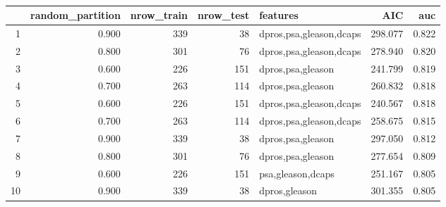 \documentclass[11pt]{article}\usepackage[]{graphicx}\usepackage[]{color}
\begin{document}
\begin{center}
\begin{table}[ht]
\centering
\begin{tabular}{rrrrlrr}
  \hline
 & random\_partition & nrow\_train & nrow\_test & features & AIC & auc \\ 
  \hline
1 & 0.900 &  339 &   38 & dpros,psa,gleason,dcaps & 298.077 & 0.822 \\ 
  2 & 0.800 &  301 &   76 & dpros,psa,gleason,dcaps & 278.940 & 0.820 \\ 
  3 & 0.600 &  226 &  151 & dpros,psa,gleason & 241.799 & 0.819 \\ 
  4 & 0.700 &  263 &  114 & dpros,psa,gleason & 260.832 & 0.818 \\ 
  5 & 0.600 &  226 &  151 & dpros,psa,gleason,dcaps & 240.567 & 0.818 \\ 
  6 & 0.700 &  263 &  114 & dpros,psa,gleason,dcaps & 258.675 & 0.815 \\ 
  7 & 0.900 &  339 &   38 & dpros,psa,gleason & 297.050 & 0.812 \\ 
  8 & 0.800 &  301 &   76 & dpros,psa,gleason & 277.654 & 0.809 \\ 
  9 & 0.600 &  226 &  151 & psa,gleason,dcaps & 251.167 & 0.805 \\ 
  10 & 0.900 &  339 &   38 & dpros,gleason & 301.355 & 0.805 \\ 
   \hline
\end{tabular}
\caption{} 
\label{reg_bootstrap}
\end{table}

\end{center}
\end{document}
